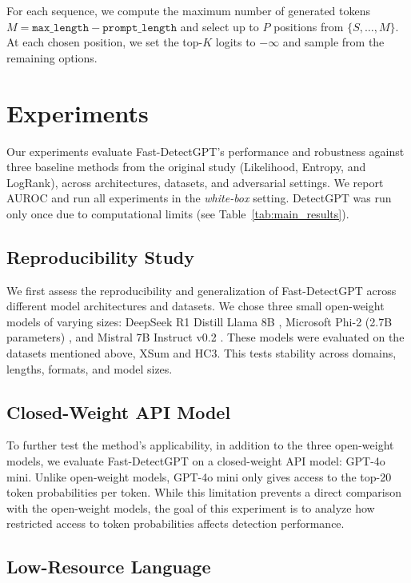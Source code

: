 \documentclass[11pt]{article}
\begin{document}
For each sequence, we compute the maximum number of generated tokens $M = \texttt{max\_length} - \texttt{prompt\_length}$ and select up to $P$ positions from $\{S, \ldots, M\}$. At each chosen position, we set the top-$K$ logits to $-\infty$ and sample from the remaining options.


\section{Experiments}

Our experiments evaluate Fast-DetectGPT’s performance and robustness against three baseline methods from the original study (Likelihood, Entropy, and LogRank), across architectures, datasets, and adversarial settings. We report AUROC and run all experiments in the \textit{white-box} setting. DetectGPT was run only once due to computational limits (see Table~\ref{tab:main_results}).

\subsection{Reproducibility Study}

We first assess the reproducibility and generalization of Fast-DetectGPT across different model architectures and datasets. We chose three small open-weight models of varying sizes: DeepSeek R1 Distill Llama 8B \cite{deepseekai}, Microsoft Phi-2 (2.7B parameters) \cite{phi2}, and Mistral 7B Instruct v0.2 \cite{mistral}. These models were evaluated on the datasets mentioned above, XSum and HC3.  This tests stability across domains, lengths, formats, and model sizes.

\subsection{Closed-Weight API Model}

To further test the method’s applicability, in addition to the three open-weight models, we evaluate Fast-DetectGPT on a closed-weight API model: GPT-4o mini. Unlike open-weight models, GPT-4o mini only gives access to the top-20 token probabilities per token. While this limitation prevents a direct comparison with the open-weight models, the goal of this experiment is to analyze how restricted access to token probabilities affects detection performance.

\subsection{Low-Resource Language}
\end{document}
